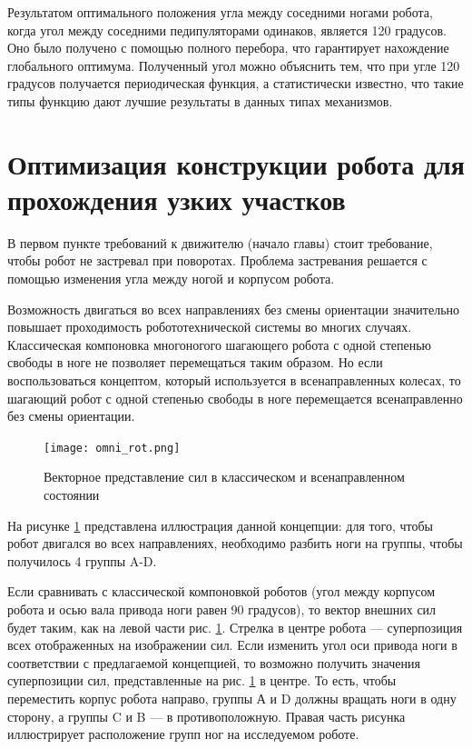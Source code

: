 Результатом оптимального положения угла между соседними ногами робота, когда угол между соседними педипуляторами одинаков, является  120 градусов. Оно было получено с помощью полного перебора, что гарантирует нахождение глобального оптимума. Полученный угол можно объяснить тем, что при угле 120 градусов получается периодическая функция, а статистически известно, что такие типы функцию дают лучшие результаты в данных типах механизмов.

\section{Оптимизация конструкции робота для прохождения узких участков}

В первом пункте требований к движителю (начало главы) стоит требование, чтобы робот не застревал при поворотах. Проблема застревания решается с помощью изменения угла между ногой и корпусом робота.

Возможность двигаться во всех направлениях без смены ориентации значительно повышает проходимость робототехнической системы во многих случаях. Классическая компоновка многоногого шагающего робота с одной степенью свободы в ноге не позволяет перемещаться таким образом. Но если воспользоваться концептом, который используется в всенаправленных колесах, то шагающий робот с одной степенью свободы в ноге перемещается всенаправленно без смены ориентации.

\begin{figure}[H]
    \centering\texttt{[image: omni\_rot.png]}
    \caption{Векторное представление сил в классическом и всенаправленном состоянии}
    \label{fig:omnidirection}
\end{figure}

На рисунке \ref{fig:omnidirection} представлена иллюстрация данной концепции: для того, чтобы робот двигался во всех направлениях, необходимо разбить ноги на группы, чтобы получилось 4 группы A-D.

Если сравнивать с классической компоновкой роботов (угол между корпусом робота и осью вала привода ноги равен 90 градусов), то вектор внешних сил будет таким, как на левой части рис. \ref{fig:omnidirection}. Стрелка в центре робота --- суперпозиция всех отображенных на изображении сил. Если изменить угол оси привода ноги в соответствии с предлагаемой концепцией, то возможно получить значения суперпозиции сил, представленные на рис. \ref{fig:omnidirection} в центре. То есть, чтобы переместить корпус робота направо, группы А и D должны вращать ноги в одну сторону, а группы C и B — в противоположную. Правая часть рисунка иллюстрирует расположение групп ног на исследуемом роботе. 

